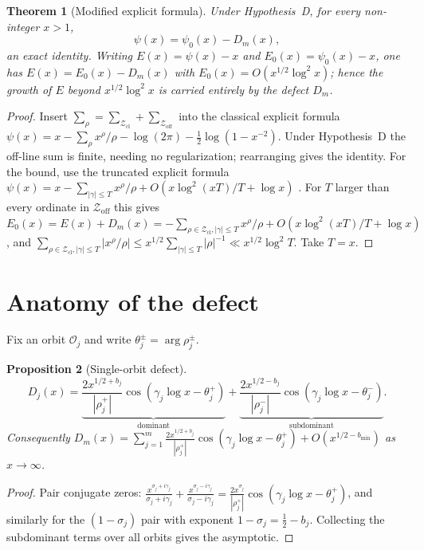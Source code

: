 \documentclass[11pt]{amsart}
\newtheorem{theorem}{Theorem}[section]
\newtheorem{proposition}[theorem]{Proposition}
\theoremstyle{definition}
\theoremstyle{remark}
\newcommand{\half}{\tfrac12}
\newcommand{\Zoff}{\mathcal Z_{\mathrm{off}}}
\newcommand{\Zcl}{\mathcal Z_{\mathrm{cl}}}
\begin{document}
\begin{theorem}[Modified explicit formula]\label{thm:mef}
Under Hypothesis~D, for every non-integer $x>1$,
\[
\psi(x)=\psi_0(x)-D_m(x),
\]
an exact identity. Writing $E(x)=\psi(x)-x$ and $E_0(x)=\psi_0(x)-x$, one has
$E(x)=E_0(x)-D_m(x)$ with $E_0(x)=O(x^{1/2}\log^2x)$; hence the growth of $E$ beyond
$x^{1/2}\log^2x$ is carried entirely by the defect $D_m$.
\end{theorem}
\begin{proof}
Insert $\sum_\rho=\sum_{\Zcl}+\sum_{\Zoff}$ into the classical explicit formula
$\psi(x)=x-\sum_\rho x^\rho/\rho-\log(2\pi)-\half\log(1-x^{-2})$. Under Hypothesis~D the
off-line sum is finite, needing no regularization; rearranging gives the identity. For the
bound, use the truncated explicit formula $\psi(x)=x-\sum_{|\gamma|\le T}x^\rho/\rho+
O(x\log^2(xT)/T+\log x)$ \cite[Ch.~17]{Davenport}. For $T$ larger than every ordinate in
$\Zoff$ this gives $E_0(x)=E(x)+D_m(x)=-\sum_{\rho\in\Zcl,|\gamma|\le T}x^\rho/\rho+
O(x\log^2(xT)/T+\log x)$, and $\sum_{\rho\in\Zcl,|\gamma|\le T}|x^\rho/\rho|\le
x^{1/2}\sum_{|\gamma|\le T}|\rho|^{-1}\ll x^{1/2}\log^2T$. Take $T=x$.
\end{proof}

\section{Anatomy of the defect}\label{sec:anatomy}

Fix an orbit $\mathcal O_j$ and write $\theta_j^\pm=\arg\rho_j^\pm$.

\begin{proposition}[Single-orbit defect]\label{prop:Dj}
\[
D_j(x)=\underbrace{\frac{2x^{1/2+b_j}}{|\rho_j^+|}\cos(\gamma_j\log x-\theta_j^+)}_{\text{dominant}}
+\underbrace{\frac{2x^{1/2-b_j}}{|\rho_j^-|}\cos(\gamma_j\log x-\theta_j^-)}_{\text{subdominant}} .
\]
Consequently $D_m(x)=\sum_{j=1}^m\frac{2x^{1/2+b_j}}{|\rho_j^+|}\cos(\gamma_j\log x-\theta_j^+)
+O(x^{1/2-b_{\min}})$ as $x\to\infty$.
\end{proposition}
\begin{proof}
Pair conjugate zeros: $\frac{x^{\sigma_j+i\gamma_j}}{\sigma_j+i\gamma_j}+\frac{x^{\sigma_j-
i\gamma_j}}{\sigma_j-i\gamma_j}=\frac{2x^{\sigma_j}}{|\rho_j^+|}\cos(\gamma_j\log x-\theta_j^+)$,
and similarly for the $(1-\sigma_j)$ pair with exponent $1-\sigma_j=\half-b_j$. Collecting the
subdominant terms over all orbits gives the asymptotic.
\end{proof}
\end{document}

